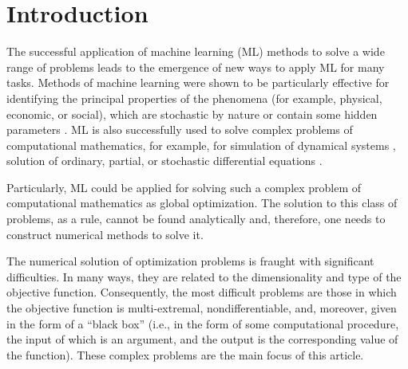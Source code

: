 \documentclass[entropy,article,submit,moreauthors,pdftex]{Definitions/mdpi}
\begin{document}

\section{Introduction}


The successful application of machine learning (ML) methods to solve a wide range of problems leads to the emergence of new ways to apply ML for many tasks. 
Methods of machine learning were shown to be particularly effective for identifying the principal properties of the phenomena (for example, physical, economic, or social), which are stochastic by nature or contain some hidden parameters \cite{Golovenkin2020,Gonoskov2019}.
ML is also successfully used to solve complex problems of computational mathematics, for example, for simulation of dynamical systems  \cite{Seleznev2019}, solution of ordinary, partial, or stochastic differential equations \cite{Lagaris1998,Blechschmidt2021,Xu2020}.

Particularly, ML could be applied for solving such a complex problem of computational mathematics as global optimization.
The solution to this class of problems, as a rule, cannot be found analytically and, therefore, one needs to construct numerical methods to solve it.

The numerical solution of optimization problems is fraught with significant difficulties. In many ways, they are related to the dimensionality and type of the objective function. Consequently, the most difficult problems are those in which the objective function is multi-extremal, nondifferentiable, and, moreover, given in the form of a ``black box'' (i.e., in the form of some computational procedure, the input of which is an argument, and the output is the corresponding value of the function). These complex problems are the main focus of this article.
\end{document}

